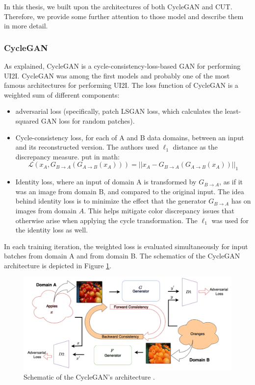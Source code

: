 In this thesis, we built upon the architectures of both CycleGAN and CUT.
Therefore, we provide some further attention to those model and describe them in more detail.

\subsubsection{CycleGAN}
As explained, CycleGAN \cite{CycleGAN2017} is a cycle-consistency-loss-based GAN for performing UI2I.
CycleGAN was among the first models and probably one of the most famous architectures for performing UI2I.
The loss function of CycleGAN is a weighted sum of different components:
\begin{itemize}
    \item adversarial loss (specifically, patch LSGAN loss, which calculates the least-squared GAN loss for random patches).
    \item Cycle-consistency loss, for each of A and B data domains, between an input and its reconstructed version. The authors used $\ell_1$ distance as the discrepancy measure. put in math:
    \begin{equation}
        \mathcal{L}\left( x_A, G_{B \rightarrow A} \left( G_{A \rightarrow B}(x_A) \right) \right) = 
        ||x_A - G_{B \rightarrow A} \left( G_{A \rightarrow B}(x_A) \right)||_1
    \end{equation}
    \item Identity loss, where an input of domain A is transformed by $G_{B \rightarrow A}$, as if it was an image from domain B, and compared to the original input.
    The idea behind identity loss is to minimize the effect that the generator $G_{B \rightarrow A}$ has on images from domain $A$.
    This helps mitigate color discrepancy issues that otherwise arise when applying the cycle transformation.
    The $\ell_1$ was used for the identity loss as well.
\end{itemize}
In each training iteration, the weighted loss is evaluated simultaneously for input batches from domain A and from domain B.
The schematics of the CycleGAN architecture is depicted in Figure \ref{fig:CycleGAN_loss_schematics}.
\begin{figure}[H]
    \centering
    \includegraphics[width=0.8\linewidth]{../figs/related_work/CycleGAN_arch.png}
    \caption{Schematic of the CycleGAN's architecture \cite{chandhok_2022}.}
    \label{fig:CycleGAN_loss_schematics}
\end{figure}


